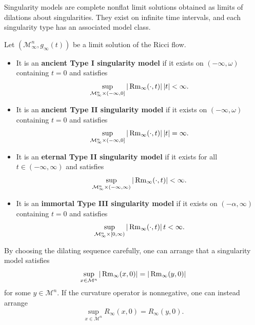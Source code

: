 \begin{remark}
\label{ch08-rem-singularity-models}
Singularity models are complete nonflat limit solutions obtained as limits of dilations about singularities. They exist on infinite time intervals, and each singularity type has an associated model class.
\end{remark}

\begin{definition}
\label{ch08-def-model-types}
Let \((\mathcal M_\infty^n,g_\infty(t))\) be a limit solution of the Ricci flow.
\begin{itemize}
\item It is an \textbf{ancient Type I singularity model} if it exists on \((-\infty,\omega)\) containing \(t=0\) and satisfies
\[
\sup_{\mathcal M_\infty^n\times(-\infty,0]} |\operatorname{Rm}_\infty(\cdot,t)|\,|t|<\infty.
\]
\item It is an \textbf{ancient Type II singularity model} if it exists on \((-\infty,\omega)\) containing \(t=0\) and satisfies
\[
\sup_{\mathcal M_\infty^n\times(-\infty,0]} |\operatorname{Rm}_\infty(\cdot,t)|\,|t|=\infty.
\]
\item It is an \textbf{eternal Type II singularity model} if it exists for all \(t\in(-\infty,\infty)\) and satisfies
\[
\sup_{\mathcal M_\infty^n\times(-\infty,\infty)} |\operatorname{Rm}_\infty(\cdot,t)|<\infty.
\]
\item It is an \textbf{immortal Type III singularity model} if it exists on \((-\alpha,\infty)\) containing \(t=0\) and satisfies
\[
\sup_{\mathcal M_\infty^n\times[0,\infty)} |\operatorname{Rm}_\infty(\cdot,t)|\,t<\infty.
\]
\end{itemize}
\end{definition}

\begin{remark}
\label{ch08-rem-point-picking}
By choosing the dilating sequence carefully, one can arrange that a singularity model satisfies
\[
\sup_{x\in \mathcal M^n} |\operatorname{Rm}_\infty(x,0)|=|\operatorname{Rm}_\infty(y,0)|
\]
for some \(y\in\mathcal M^n\). If the curvature operator is nonnegative, one can instead arrange
\[
\sup_{x\in \mathcal M^n} R_\infty(x,0)=R_\infty(y,0).
\]
\end{remark}


